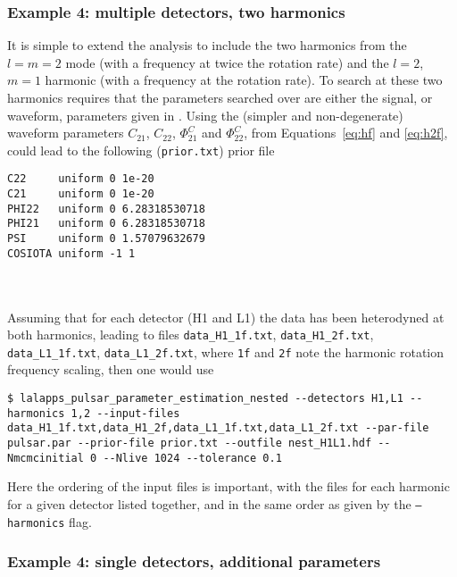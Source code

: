 \subsubsection{Example 4: multiple detectors, two harmonics}

It is simple to extend the analysis to include the two harmonics from the $l=m=2$ mode (with a \gw frequency at twice the rotation rate) and the $l=2$, $m=1$
harmonic (with a \gw frequency at the rotation rate). To search at these two harmonics requires that the parameters searched over are either the signal, or
waveform, parameters given in \citet{2015MNRAS.453.4399P}. Using the (simpler and non-degenerate) waveform parameters $C_{21}$, $C_{22}$, $\Phi_{21}^C$ and
$\Phi_{22}^C$, from Equations~\ref{eq:hf} and \ref{eq:h2f}, could lead to the following ({\tt prior.txt}) prior file
\begin{lrbox}{\Lst}
\begin{lstlisting}
C22     uniform 0 1e-20
C21     uniform 0 1e-20
PHI22   uniform 0 6.28318530718
PHI21   uniform 0 6.28318530718
PSI     uniform 0 1.57079632679
COSIOTA uniform -1 1
\end{lstlisting}
\end{lrbox}
\\[5pt] \indent \fbox{\usebox{\Lst}} \\[5pt]
Assuming that for each detector (H1 and L1) the data has been heterodyned at both harmonics, leading to files {\tt data\_H1\_1f.txt}, {\tt data\_H1\_2f.txt},
{\tt data\_L1\_1f.txt}, {\tt data\_L1\_2f.txt}, where {\tt 1f} and {\tt 2f} note the harmonic rotation frequency scaling, then one would use
\begin{lstlisting}[frame=single]
$ lalapps_pulsar_parameter_estimation_nested --detectors H1,L1 --harmonics 1,2 --input-files data_H1_1f.txt,data_H1_2f,data_L1_1f.txt,data_L1_2f.txt --par-file pulsar.par --prior-file prior.txt --outfile nest_H1L1.hdf --Nmcmcinitial 0 --Nlive 1024 --tolerance 0.1
\end{lstlisting}
Here the ordering of the input files is important, with the files for each harmonic for a given detector listed together, and in the same order as given by the
{\tt --harmonics} flag.

\subsubsection{Example 4: single detectors, additional parameters}

